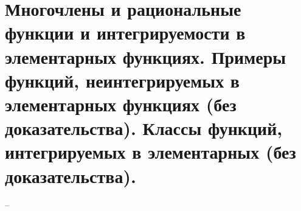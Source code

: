 \section{Многочлены и рациональные функции и интегрируемости в элементарных функциях. Примеры функций, неинтегрируемых в элементарных функциях (без доказательства). Классы функций, интегрируемых в элементарных (без доказательства).}
--
\newline
